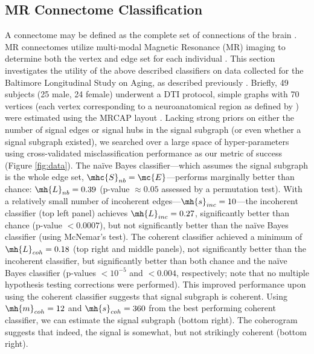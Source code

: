 \documentclass[10pt,journal,cspaper,compsoc]{IEEEtran}
\begin{document}

\subsection{MR Connectome Classification} %
\label{sub:mr_connectome_classification}

A connectome may be defined as the complete set of connections of the brain \cite{Sporns2010}.  MR connectomes utilize multi-modal Magnetic Resonance (MR) imaging to determine both the vertex and edge set for each individual \cite{Hagmann2010}.  This section investigates the utility of the above described classifiers on data collected for the Baltimore Longitudinal Study on Aging, as described previously \cite{OHBM10}.  Briefly, 49 subjects (25 male, 24 female) underwent a DTI protocol, simple graphs with 70 vertices (each vertex corresponding to a neuroanatomical region as defined by \cite{Desikan2006}) were estimated using the MRCAP layout \cite{BMES10}.  Lacking strong priors on either the number of signal edges or signal hubs in the signal subgraph (or even whether a signal subgraph existed), we searched over a large space of hyper-parameters using cross-validated misclassification performance as our metric of success (Figure \ref{fig:data}).  The na\"ive Bayes classifier---which assumes the signal subgraph is the whole edge set, $\mhc{S}_{nb}=\mc{E}$---performs marginally better than chance: $\mh{L}_{nb}=0.39$ (p-value $\approx 0.05$ assessed by a permutation test).  With a relatively small number of incoherent edges---$\mh{s}_{inc}=10$---the incoherent classifier (top left panel) achieves $\mh{L}_{inc}=0.27$, significantly better than chance (p-value $<0.0007$), but not significantly better than the na\"ive Bayes classifier (using McNemar's test).  The coherent classifier achieved a minimum of $\mh{L}_{coh}=0.18$ (top right and middle panels), not significantly better than the incoherent classifier, but significantly better than both chance and the na\"ive Bayes classifier (p-values $<10^{-5}$ and $<0.004$, respectively; note that no multiple hypothesis testing corrections were performed).  This improved performance upon using the coherent classifier suggests that signal subgraph is coherent. Using $\mh{m}_{coh}=12$ and $\mh{s}_{coh}=360$ from the best performing coherent classifier, we can estimate the signal subgraph (bottom right).  The coherogram suggests that indeed, the signal is somewhat, but not strikingly coherent (bottom right).
\end{document}
